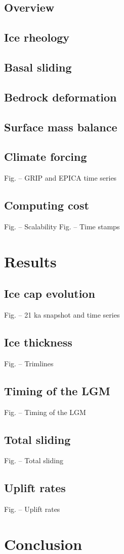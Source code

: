 \documentclass{article}
\begin{document}
\subsection{Overview}
\subsection{Ice rheology}
\subsection{Basal sliding}
\subsection{Bedrock deformation}
\subsection{Surface mass balance}
\subsection{Climate forcing}
    Fig. -- GRIP and EPICA time series
\subsection{Computing cost}
    Fig. -- Scalability
    Fig. -- Time stamps

\section{Results}
\subsection{Ice cap evolution}
    Fig. -- 21 ka snapshot and time series
\subsection{Ice thickness}
    Fig. -- Trimlines
\subsection{Timing of the LGM}
    Fig. -- Timing of the LGM
\subsection{Total sliding}
    Fig. -- Total sliding
\subsection{Uplift rates}
    Fig. -- Uplift rates

\section{Conclusion}

\end{document}
